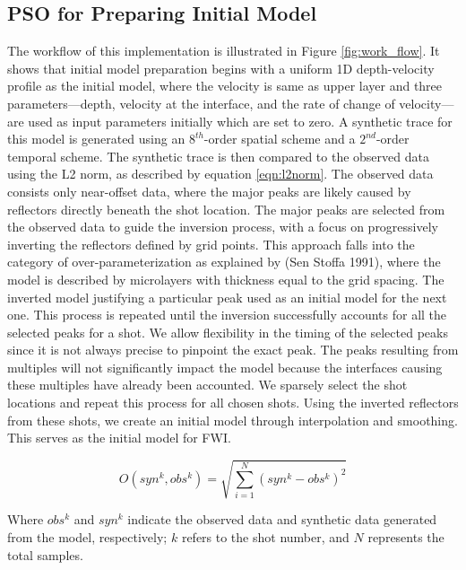 \documentclass[paper,revised]{geophysics}
\begin{document}
\subsection{PSO for Preparing Initial Model}
The workflow of this implementation is illustrated in Figure \ref{fig:work_flow}. It shows that initial model preparation begins with a uniform 1D depth-velocity profile as the initial model, where the velocity is same as upper layer and three parameters—depth, velocity at the interface, and the rate of change of velocity—are used as input parameters initially which are set to zero. A synthetic trace for this model is generated using an \(8^{th}\)-order spatial scheme and a \(2^{nd}\)-order temporal scheme. The synthetic trace is then compared to the observed data using the L2 norm, as described by equation \ref{eqn:l2norm}. The observed data consists only near-offset data, where the major peaks are likely caused by reflectors directly beneath the shot location. The major peaks are selected from the observed data to guide the inversion process, with a focus on progressively inverting the reflectors defined by grid points. This approach falls into the category of over-parameterization as explained by (Sen Stoffa 1991), where the model is described by microlayers with thickness equal to the grid spacing. The inverted model justifying a particular peak used as an initial model for the next one. This process is repeated until the inversion successfully accounts for all the selected peaks for a shot. We allow flexibility in the timing of the selected peaks since it is not always precise to pinpoint the exact peak. The peaks resulting from multiples will not significantly impact the model because the interfaces causing these multiples have already been accounted.
We sparsely select the shot locations and repeat this process for all chosen shots. Using the inverted reflectors from these shots, we create an initial model through interpolation and smoothing. This serves as the initial model for FWI.


\begin{equation}
	O(syn^k, obs^k) = \sqrt{\sum_{i=1}^{N} \left( syn^k - obs^k \right)^2}
	\label{eqn:l2norm}
\end{equation}

Where \(obs^k\) and \(syn^k\) indicate the observed data and synthetic data generated from the model, respectively; \(k\) refers to the shot number, and \(N\) represents the total samples.
\end{document}
